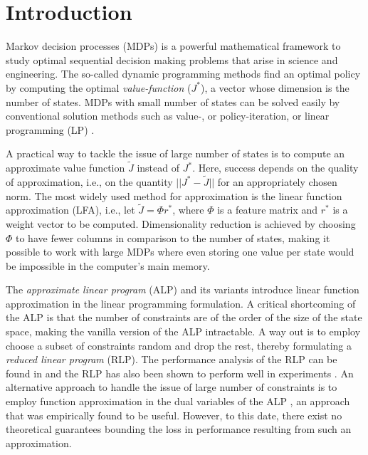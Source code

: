 \section{Introduction}
Markov decision processes (MDPs) is a powerful mathematical framework to study optimal sequential decision making problems that arise in science and engineering. The so-called dynamic programming methods find an optimal policy by computing the optimal \emph{value-function} ($J^*$), a vector whose dimension is the number of states. MDPs with small number of states can be solved easily by conventional solution methods such as value-, or policy-iteration, or linear programming (LP) \cite{BertB}. 

A practical way to tackle the issue of large number of states is to compute an approximate value function $\tilde{J}$ instead of $J^*$. Here, success depends on the quality of approximation, i.e., on the quantity $||J^*-\tilde{J}||$ for an appropriately chosen norm. The most widely used method for approximation is the linear function approximation (LFA), i.e., let $\tilde{J}=\Phi r^*$, where $\Phi$ is a feature matrix and $r^*$ is a weight vector to be computed. Dimensionality reduction is achieved by choosing $\Phi$ to have fewer columns in comparison to the number of states, making it possible to work with large MDPs where even storing one value per state would be impossible in the computer's main memory.

The \emph{approximate linear program} (ALP) \cite{ALP,CS,SALP,ALP-Bor} and its variants introduce linear function approximation in the linear programming formulation. A critical shortcoming of the ALP is that the number of constraints are of the order of the size of the state space, making the vanilla version of the ALP intractable. A way out is to employ choose a subset of constraints random and drop the rest, thereby formulating a \emph{reduced linear program} (RLP). The performance analysis of the RLP can be found in \cite{CS} and the RLP has also been shown to perform well in experiments \cite{ALP,CS,CST}. An alternative approach to handle the issue of large number of constraints is to employ function approximation in the dual variables of the ALP \cite{ALP-Bor,dolgov}, an approach that was empirically found to be useful. However, to this date, there exist no theoretical guarantees bounding the loss in performance resulting from such an approximation.

